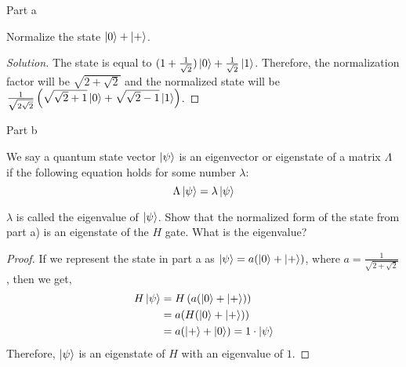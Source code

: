 \begin{solution}{Part a}\label{ques:3a}
  \begin{question}
    Normalize the state $\ket{0} + \ket{+}$.
  \end{question}
  \tcblower{}
  \begin{proof}[Solution]
    The state is equal to $(1 + \frac{1}{\sqrt{2}})\ket{0} + \frac{1}{\sqrt{2}}\ket{1}$. Therefore, the normalization factor will be $\sqrt{2 + \sqrt{2}}$ and the normalized state will be $\frac{1}{\sqrt{2\sqrt{2}}}\left(\sqrt{\sqrt{2} + 1}\ket{0} + \sqrt{\sqrt{2} - 1}\ket{1}\right)$.
  \end{proof}
\end{solution}

\begin{solution}{Part b}\label{ques:3b}
  \begin{question}
    We say a quantum state vector $\ket{\psi}$ is an eigenvector or eigenstate of a matrix $\Lambda$ if the following equation holds for some number $\lambda$:
\[
\Lambda \ket{\psi} = \lambda \ket{\psi}
\]

$\lambda$ is called the eigenvalue of $\ket{\psi}$. Show that the normalized form of the state from part a) is an eigenstate of the $H$ gate. What is the eigenvalue?
  \end{question}
  \tcblower{}
  \begin{proof}
    If we represent the state in part a as $\ket{\psi} = a(\ket{0} + \ket{+})$, where $a = \frac{1}{\sqrt{2 + \sqrt{2}}}$, then we get,
    \begin{equation}
      \begin{split}
        H\ket{\psi} &= H\left(a(\ket{0} + \ket{+})\right)\\
        &= a(H(\ket{0} + \ket{+}))\\
        &= a(\ket{+} + \ket{0}) = 1\cdot\ket{\psi}
      \end{split}
    \end{equation}
    Therefore, $\ket{\psi}$ is an eigenstate of $H$ with an eigenvalue of $1$.
  \end{proof}
\end{solution}

